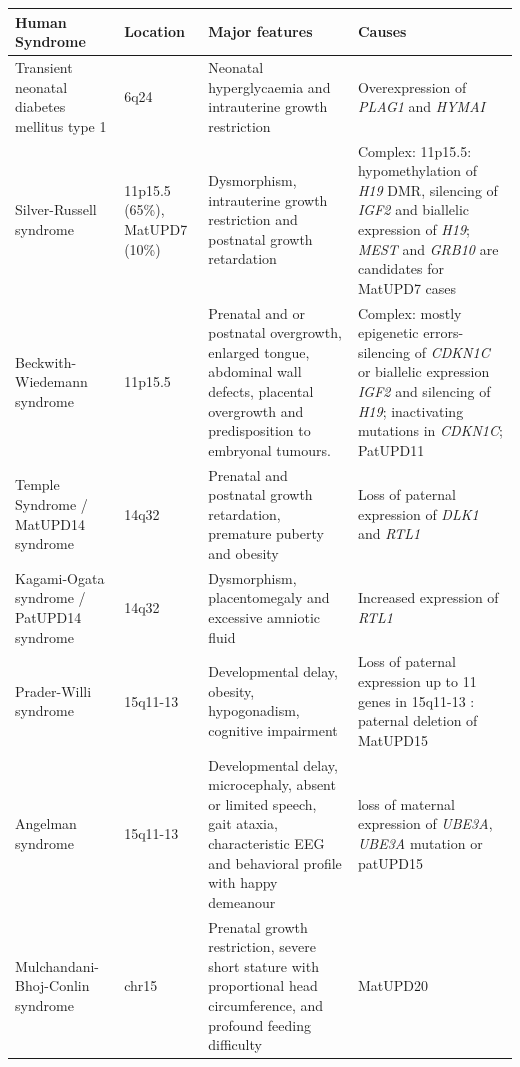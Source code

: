 \begin{table}[!htb]
\centering
\begin{adjustbox}{width=1\textwidth}
\begin{tabular}{@{}p{3cm}p{2cm}p{7cm}p{7cm}@{}}
\toprule Human Syndrome & Location & Major features & Causes \\ \midrule 
Transient neonatal diabetes mellitus type 1\cite{Mackay:2006bv} & 6q24& Neonatal hyperglycaemia and intrauterine growth restriction & Overexpression of \emph{PLAG1} and \emph{HYMAI}\\
Silver-Russell syndrome\cite{Eggermann:2010gl,Wakeling:2017kv} & 11p15.5 (65\%), MatUPD7  (10\%) & Dysmorphism, intrauterine growth restriction and postnatal growth retardation & Complex: 11p15.5: hypomethylation of \emph{H19} DMR, silencing of \emph{IGF2} and biallelic expression of \emph{H19}; \emph{MEST} and \emph{GRB10} are candidates for MatUPD7 cases\\
Beckwith-Wiedemann syndrome\cite{Choufani:2010ca} & 11p15.5 & Prenatal and or postnatal overgrowth, enlarged tongue, abdominal wall defects, placental overgrowth and predisposition to embryonal tumours. & Complex: mostly epigenetic errors- silencing of \emph{CDKN1C} or biallelic expression \emph{IGF2} and silencing of \emph{H19}; inactivating mutations in \emph{CDKN1C}; PatUPD11\\
Temple Syndrome\cite{Ioannides:2014ka,Kagami:2017gp} / MatUPD14 syndrome & 14q32 & Prenatal and postnatal growth retardation, premature puberty and obesity & Loss of paternal expression of \emph{DLK1} and \emph{RTL1} \\
Kagami-Ogata syndrome\cite{Kagami:2015gn,Kagami:2017gp,Ogata:2016jb} / PatUPD14 syndrome & 14q32 & Dysmorphism, placentomegaly and excessive amniotic fluid & Increased expression of \emph{RTL1}\\
Prader-Willi syndrome\cite{Buiting:2010ci} & 15q11-13 & Developmental delay, obesity, hypogonadism, cognitive impairment & Loss of paternal expression up to 11 genes in 15q11-13 : paternal deletion of MatUPD15\\  
Angelman syndrome\cite{Buiting:2010ci}  & 15q11-13 & Developmental delay, microcephaly, absent or limited speech, gait ataxia, characteristic EEG and behavioral profile with happy demeanour & loss of maternal expression of \emph{UBE3A}, \emph{UBE3A} mutation or patUPD15\\
Mulchandani-Bhoj-Conlin syndrome\cite{Mulchandani:2016kf} & chr15 & Prenatal growth restriction, severe short stature with proportional head circumference, and profound feeding difficulty & MatUPD20\\

\end{tabular}
\end{adjustbox}
\end{table}
